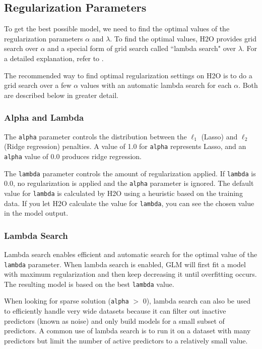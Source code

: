 \subsection{Regularization Parameters}

To get the best possible model, we need to find the optimal values of the regularization parameters $\alpha$ and
$\lambda$.  To find the optimal values, H2O provides grid search over $\alpha$ and a special form of grid search
called ``lambda search" over $\lambda$. For a detailed explanation, refer to {\textbf{}}.

The recommended way to find optimal regularization settings on H2O is to do
a grid search over a few $\alpha$ values with an automatic lambda search for each $\alpha$. Both are described
below in greater detail.

\subsubsection{Alpha and Lambda}

The \texttt{alpha} parameter controls the distribution between  the $\ell_1$ (Lasso) and  $\ell_2$ (Ridge regression) penalties.  A value of 1.0 for \texttt{alpha} 
 represents Lasso, and an \texttt{alpha} value of 0.0 produces ridge regression.

The \texttt{lambda} parameter controls the amount of regularization applied.  If \texttt{lambda} is 0.0, no 
regularization is applied and the \texttt{alpha} parameter is ignored.  The default value for \texttt{lambda} is
calculated by H2O using a heuristic based on the training data.  If you let H2O calculate the value for \texttt{lambda}, you can see the chosen value in the model output.

\subsubsection{Lambda Search}
Lambda search enables efficient and automatic search for the optimal value of the \texttt{lambda} parameter. When lambda search is enabled, GLM will first fit a model with maximum regularization and then keep decreasing it until overfitting occurs. The resulting model is based on the best \texttt{lambda} value. 

When looking for sparse solution (\texttt{alpha} $>$ 0), lambda search can also be used to efficiently handle very wide datasets because it can filter out inactive predictors (known as noise) and only build models for a small subset of predictors. A common use of lambda search is to run it on a dataset with many predictors but limit the number of active predictors to a relatively small value.  

